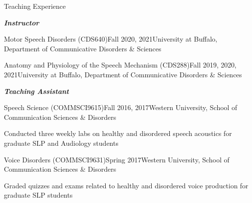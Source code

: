 \documentclass{resume} %
\begin{document}




\begin{rSection}{Teaching Experience}

\begin{center}
	{\bf \emph{Instructor}}
\end{center}

	\begin{rSubsection}{Motor Speech Disorders (CDS640)}{Fall 2020, 2021}{University at Buffalo, Department of Communicative Disorders \& Sciences}{}
	\end{rSubsection}
	
	\begin{rSubsection}{Anatomy and Physiology of the Speech Mechanism (CDS288)}{Fall 2019, 2020, 2021}{University at Buffalo, Department of Communicative Disorders \& Sciences}{}
	\end{rSubsection}

\begin{center}
	{\bf \emph{Teaching Assistant}}
\end{center}
	
	\begin{rSubsection}{Speech Science (COMMSCI9615)}{Fall 2016, 2017}{Western University, School of Communication Sciences \& Disorders}{}
	\item Conducted three weekly labs on healthy and disordered speech acoustics for graduate SLP and Audiology students
	\end{rSubsection}

	\begin{rSubsection}{Voice Disorders (COMMSCI9631)}{Spring 2017}{Western University, School of Communication Sciences \& Disorders}{}
	\item Graded quizzes and exams related to healthy and disordered voice production for graduate SLP students
	\end{rSubsection}
	

\end{rSection}
\end{document}
